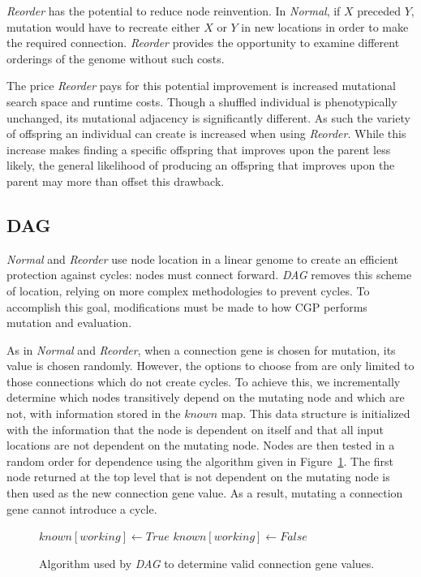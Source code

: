 \documentclass[journal]{IEEEtran}
\begin{document}
\emph{Reorder} has the potential to reduce node reinvention.  In \emph{Normal}, if
$X$ preceded $Y$, mutation would have to recreate either $X$ or $Y$ in new locations
in order to make the required connection.  \emph{Reorder} provides the opportunity
to examine different orderings of the genome without such costs.

The price \emph{Reorder} pays for this potential improvement is increased mutational search
space and runtime costs.  Though a shuffled individual is phenotypically unchanged,
its mutational adjacency is significantly different.  As such the variety of offspring
an individual can create is increased when using \emph{Reorder}.  While this increase
makes finding a specific offspring that improves upon the parent less likely, the
general likelihood of producing an offspring that improves upon the parent may 
more than offset this drawback.


\subsection{DAG}
\label{sec:dag}
\emph{Normal} and \emph{Reorder} use node location in a linear genome to create
an efficient protection against cycles: nodes must connect forward.  \emph{DAG}
removes this scheme of location, relying on more complex methodologies to
prevent cycles.  To accomplish this goal, modifications must be made to how CGP
performs mutation and evaluation.

As in \emph{Normal} and \emph{Reorder}, when a connection gene is chosen for mutation, its value is chosen randomly.
However, the options to choose from are only limited to those connections which do not
create cycles.
To achieve this, we incrementally determine
which nodes transitively depend on the mutating node and which are not, with
information stored in the $known$ map.  This data structure is initialized with
the information that the node is dependent on itself and that all input locations
are not dependent on the mutating node.  Nodes are then
tested in a random order for dependence using the  algorithm given in Figure~\ref{fig:dag}.
The first node returned at the top level that is not dependent on the mutating node is then
used as the new connection gene value.  As a result, mutating a connection gene
cannot introduce a cycle.

\begin{figure}
  \begin{algorithmic}
      \State{}
    \EndIf
        \State $known[working] \leftarrow True$
        \State{}
      \EndIf
    \EndFor
    \State $known[working] \leftarrow False$
    \State{}
  \EndProcedure
  \end{algorithmic}
  \caption{Algorithm used by \emph{DAG} to determine valid connection gene values.}
  \label{fig:dag}
\end{figure}
\end{document}

